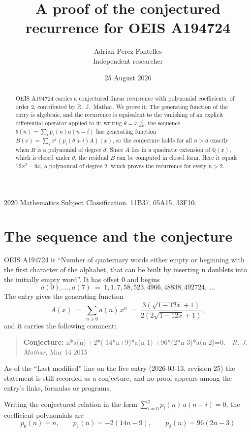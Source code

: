 \documentclass[11pt,a4paper]{article}
\title{A proof of the conjectured recurrence for OEIS A194724}
\author{Adrian Perez Fontelles\\ \small Independent researcher}
\date{25 August 2026}
\theoremstyle{plain}
\theoremstyle{definition}
\begin{document}
\maketitle

\begin{abstract}
OEIS A194724 carries a conjectured linear recurrence with polynomial coefficients, of
order 2, contributed by R.~J.~Mathar. We prove it. The generating function of the
entry is algebraic, and the recurrence is equivalent to the vanishing of an explicit
differential operator applied to it: writing $\theta=x\,\frac{d}{dx}$, the sequence
$b(n)=\sum_{i}p_{i}(n)a(n-i)$ has generating function
$B(x)=\sum_{i}x^{i}\,(p_{i}(\theta+i)A)(x)$, so the conjecture holds for all $n>d$ exactly
when $B$ is a polynomial of degree $d$. Since $A$ lies in a quadratic extension of
$\mathbb{Q}(x)$, which is closed under $\theta$, the residual $B$ can be computed in
closed form. Here it equals $72 x^{2} - 9 x$, a polynomial of degree $2$, which proves
the recurrence for every $n>2$.
\end{abstract}

\noindent\small 2020 Mathematics Subject Classification. 11B37, 05A15, 33F10.\normalsize

\section{The sequence and the conjecture}

OEIS A194724 is ``Number of quaternary words either empty or beginning with the first character of the alphabet, that can be built by inserting n doublets into the initially empty word''. It has offset $0$ and begins
\[
a(0),\dots,a(7)\;=\;1, 1, 7, 58, 523, 4966, 48838, 492724,\ \dots
\]
The entry gives the generating function
\begin{equation}\label{eq:gf}
A(x)\;=\;\sum_{n\ge 0} a(n)\,x^{n}\;=\;\frac{3 \left(\sqrt{1 - 12 x} + 1\right)}{2 \left(2 \sqrt{1 - 12 x} + 1\right)} ,
\end{equation}
and it carries the following comment:
\begin{quote}\small
\textbf{Conjecture:} n*a(n) +2*(-14*n+9)*a(n-1) +96*(2*n-3)*a(n-2)=0. - \emph{R. J. Mathar}, Mar 14 2015
\end{quote}
As of the ``Last modified'' line on the live entry (2026-03-13, revision 25) the
statement is still recorded as a conjecture, and no proof appears among the entry's links,
formulas or programs.

Writing the conjectured relation in the form $\sum_{i=0}^{2}p_{i}(n)\,a(n-i)=0$,
the coefficient polynomials are
\[
p_{0}(n)=n,\qquad p_{1}(n)=- 2 \left(14 n - 9\right),\qquad p_{2}(n)=96 \left(2 n - 3\right)
\]
\end{document}
